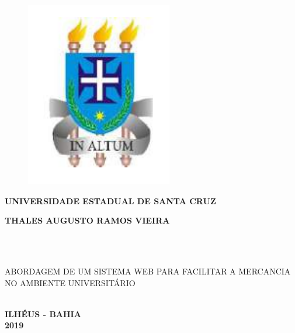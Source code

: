 \thispagestyle{empty}

\vfill
 \begin{center}
    
    \begin{figure}
	   \centering
	   		\includegraphics[scale=0.35]{figs/brasao_uesc.png} 
    \end{figure}
    
    {\large\bfseries UNIVERSIDADE ESTADUAL DE SANTA CRUZ} \\
    
   

    \vspace*{1in}
    \begin{large} \bfseries THALES AUGUSTO RAMOS VIEIRA \end{large}\\[0.4in]

    \vspace*{4cm}
    \noindent \\
    
    \large\bfseries{\begin{large}ABORDAGEM DE UM SISTEMA WEB PARA FACILITAR A MERCANCIA NO AMBIENTE UNIVERSITÁRIO \end{large}} \\
    \vfill
    \large\bfseries{ ILHÉUS - BAHIA \\ 2019}
\end{center}

\normalsize


